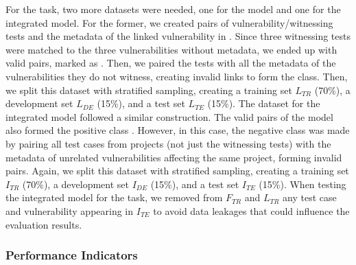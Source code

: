 For the \matching task, two more datasets were needed, one for the \linker model and one for the integrated model.
For the former, we created pairs of vulnerability\-/witnessing tests and the metadata of the linked vulnerability in \VulforJ.
Since three witnessing tests were matched to the three vulnerabilities without metadata, we ended up with \evalLinkerTrue valid pairs, marked as \linkerPosClass.
Then, we paired the \evalLinkerTrue tests with all the metadata of the vulnerabilities they do not witness, creating \evalLinkerFalse invalid links to form the \linkerNegClass class.
Then, we split this dataset with stratified sampling, creating a training set $L_{TR}$ (70\%), a development set $L_{DE}$ (15\%), and a test set $L_{TE}$ (15\%).
%
The dataset for the integrated model followed a similar construction.
The \evalGlobalTrue valid pairs of the \linker model also formed the positive class \globalPosClass.
However, in this case, the negative class \globalNegClass was made by pairing all test cases from \VulforJ projects (not just the witnessing tests) with the metadata of unrelated vulnerabilities affecting the same project, forming \evalGlobalFalse invalid pairs.
Again, we split this dataset with stratified sampling, creating a training set $I_{TR}$ (70\%), a development set $I_{DE}$ (15\%), and a test set $I_{TE}$ (15\%).
%
When testing the integrated model for the \matching task, we removed from $F_{TR}$ and $L_{TR}$ any test case and vulnerability appearing in $I_{TE}$ to avoid data leakages that could influence the evaluation results.

\subsubsection{Performance Indicators}
\label{subsub:eval}

